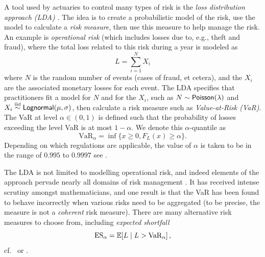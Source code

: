 \begin{example}

A tool used by actuaries to control many types of risk is the \emph{loss distribution approach (LDA)} \cite{frachot2003loss}. The idea is to create a probabilistic model of the risk, use the model to calculate a \emph{risk measure}, then use this measure to help manage the risk. An example is \emph{operational risk} (which includes losses due to, e.g., theft and fraud), where the total loss related to this risk during a year is modeled as
\[ L = \sum_{i=1}^N X_i \]
where $N$ is the random number of events (cases of fraud, et cetera), and the $X_i$ are the associated monetary losses for each event. The LDA specifies that practitioners fit a model for $N$ and for the $X_i$, such as $N\sim\mathsf{Poisson}(\lambda)$ and $X_i \overset{\smash{\mathrm{iid}}}{\sim} \mathsf{Lognormal}(\mu,\sigma)$, then calculate a risk measure such as \emph{Value-at-Risk (VaR)}. The VaR at level $\alpha \in (0,1)$ is defined such that the probability of losses exceeding the level VaR is at most $1-\alpha$. We denote this $\alpha$-quantile as
\begin{equation*}
\text{VaR}_\alpha = \inf\{x\geq0, F_{L}(x)\geq \alpha\}.
\end{equation*}
Depending on which regulations are applicable, the value of $\alpha$ is taken to be in the range of $0.995$ to $0.9997$ see \cite{EIOPA,frachot2001loss}.

The LDA is not limited to modelling operational risk, and indeed elements of the approach pervade nearly all domains of risk management \cite{mcneil2015quantitative}. It has received intense scrutiny amongst mathematicians, and one result is that the VaR has been found to behave incorrectly when various risks need to be aggregated (to be precise, the measure is not a \emph{coherent} risk measure). There are many alternative risk measures to choose from, including \emph{expected shortfall}
\[ \text{ES}_\alpha = \operatorname{{\mathbb E}}[ L \mid L > \text{VaR}_\alpha ] \,, \]
cf.\ \cite{mcneil2015quantitative} or \cite{kluppelberg2014risk}.
\remQED
\end{example}

